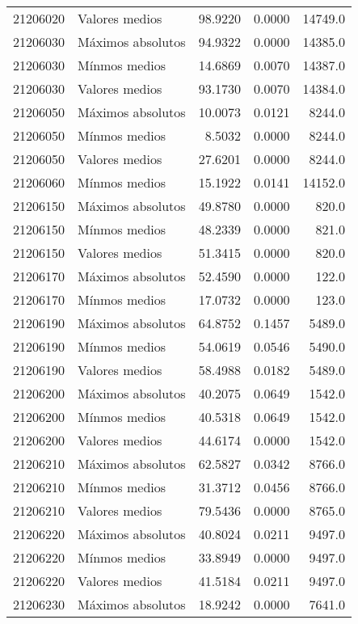 \begin{longtable}{llrrr}
 21206020 &     Valores medios &       98.9220 &         0.0000 &         14749.0 \\
 21206030 &  Máximos absolutos &       94.9322 &         0.0000 &         14385.0 \\
 21206030 &      Mínmos medios &       14.6869 &         0.0070 &         14387.0 \\
 21206030 &     Valores medios &       93.1730 &         0.0070 &         14384.0 \\
 21206050 &  Máximos absolutos &       10.0073 &         0.0121 &          8244.0 \\
 21206050 &      Mínmos medios &        8.5032 &         0.0000 &          8244.0 \\
 21206050 &     Valores medios &       27.6201 &         0.0000 &          8244.0 \\
 21206060 &      Mínmos medios &       15.1922 &         0.0141 &         14152.0 \\
 21206150 &  Máximos absolutos &       49.8780 &         0.0000 &           820.0 \\
 21206150 &      Mínmos medios &       48.2339 &         0.0000 &           821.0 \\
 21206150 &     Valores medios &       51.3415 &         0.0000 &           820.0 \\
 21206170 &  Máximos absolutos &       52.4590 &         0.0000 &           122.0 \\
 21206170 &      Mínmos medios &       17.0732 &         0.0000 &           123.0 \\
 21206190 &  Máximos absolutos &       64.8752 &         0.1457 &          5489.0 \\
 21206190 &      Mínmos medios &       54.0619 &         0.0546 &          5490.0 \\
 21206190 &     Valores medios &       58.4988 &         0.0182 &          5489.0 \\
 21206200 &  Máximos absolutos &       40.2075 &         0.0649 &          1542.0 \\
 21206200 &      Mínmos medios &       40.5318 &         0.0649 &          1542.0 \\
 21206200 &     Valores medios &       44.6174 &         0.0000 &          1542.0 \\
 21206210 &  Máximos absolutos &       62.5827 &         0.0342 &          8766.0 \\
 21206210 &      Mínmos medios &       31.3712 &         0.0456 &          8766.0 \\
 21206210 &     Valores medios &       79.5436 &         0.0000 &          8765.0 \\
 21206220 &  Máximos absolutos &       40.8024 &         0.0211 &          9497.0 \\
 21206220 &      Mínmos medios &       33.8949 &         0.0000 &          9497.0 \\
 21206220 &     Valores medios &       41.5184 &         0.0211 &          9497.0 \\
 21206230 &  Máximos absolutos &       18.9242 &         0.0000 &          7641.0 \\
\end{longtable}


